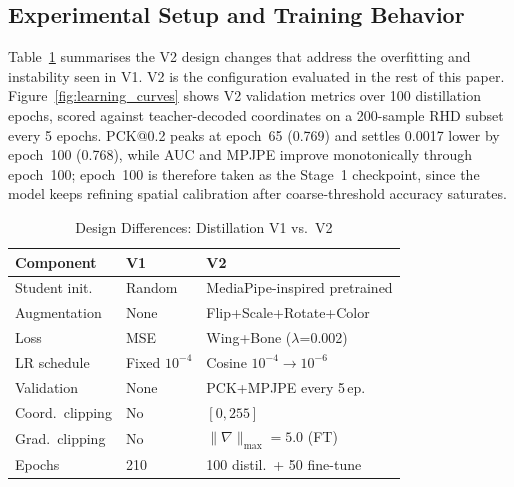 \documentclass[11pt,conference,a4paper]{APSIPA2026}
\begin{document}
\subsection{Experimental Setup and Training Behavior}
\label{sec:setup_training}

Table~\ref{tab:v1v2} summarises the V2 design changes that address
the overfitting and instability seen in V1. V2 is the configuration
evaluated in the rest of this paper. Figure~\ref{fig:learning_curves} shows V2 validation metrics
over 100 distillation epochs, scored against teacher-decoded
coordinates on a 200-sample RHD subset every 5 epochs. PCK@0.2 peaks
at epoch~65 (0.769) and settles 0.0017 lower by epoch~100 (0.768),
while AUC and MPJPE improve monotonically through epoch~100;
epoch~100 is therefore taken as the Stage~1 checkpoint, since the
model keeps refining spatial calibration after coarse-threshold
accuracy saturates.

\begin{table}[!t]
\caption{Design Differences: Distillation V1 vs.\ V2}
\label{tab:v1v2}
\centering
\footnotesize
\setlength{\tabcolsep}{4pt}
\renewcommand{\arraystretch}{1.0}
\begin{tabular}{lll}
\toprule
\textbf{Component} & \textbf{V1} & \textbf{V2} \\
\midrule
Student init.      & Random            & MediaPipe-inspired pretrained \\
Augmentation       & None              & Flip+Scale+Rotate+Color \\
Loss               & MSE               & Wing+Bone ($\lambda$=0.002) \\
LR schedule        & Fixed $10^{-4}$   & Cosine $10^{-4}\!\to\!10^{-6}$ \\
Validation         & None              & PCK+MPJPE every 5\,ep. \\
Coord.\ clipping   & No                & $[0,255]$ \\
Grad.\ clipping    & No                & $\|\nabla\|_{\max}=5.0$ (FT) \\
Epochs             & 210               & 100 distil.\ + 50 fine-tune \\
\bottomrule
\end{tabular}
\end{table}
\end{document}
